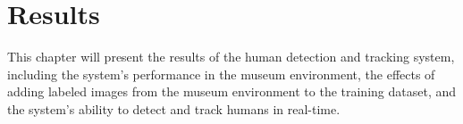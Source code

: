 \section{Results}
\label{sec:results}
This chapter will present the results of the human detection and tracking system, including the system's performance in the museum environment, the effects of adding labeled images from the museum environment to the training dataset, and the system's ability to detect and track humans in real-time.

\label{sec:results_heatmaps}
